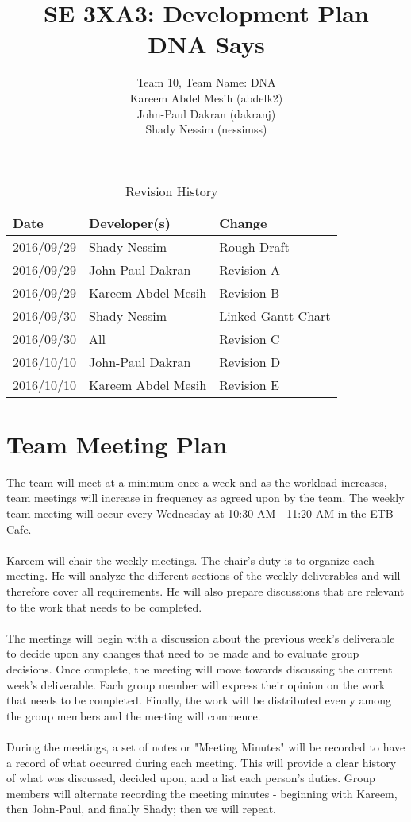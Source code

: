\documentclass{article}
\title{SE 3XA3: Development Plan\\DNA Says}
\author{Team 10, Team Name: DNA
		\\ Kareem Abdel Mesih (abdelk2)
		\\ John-Paul Dakran (dakranj)
		\\ Shady Nessim (nessimss)
}
\date{}
\begin{document}
\maketitle
\newpage
\tableofcontents

\begin{table}[hp]
\caption{Revision History} \label{TblRevisionHistory}
\begin{tabularx}{\textwidth}{llX}
\toprule
\textbf{Date} & \textbf{Developer(s)} & \textbf{Change}\\
\midrule
2016/09/29 & Shady Nessim & Rough Draft\\
2016/09/29 & John-Paul Dakran &  Revision A\\
2016/09/29 & Kareem Abdel Mesih &  Revision B\\
2016/09/30 & Shady Nessim & Linked Gantt Chart\\
2016/09/30 & All & Revision C\\
2016/10/10 & John-Paul Dakran & Revision D\\
2016/10/10 & Kareem Abdel Mesih & Revision E\\
\bottomrule
\end{tabularx}
\end{table}
\newpage
\newpage


\section{Team Meeting Plan} 
The team will meet at a minimum once a week and as the workload increases, team meetings will increase in frequency as agreed upon by the team. The weekly team meeting will occur every Wednesday at 10:30 AM - 11:20 AM in the ETB Cafe.\\
\\
\indent Kareem will chair the weekly meetings. The chair's duty is to organize each meeting. He will analyze the different sections of the weekly deliverables and will therefore cover all requirements. He will also prepare discussions that are relevant to the work that needs to be completed.\\
\\
\indent The meetings will begin with a discussion about the previous week's deliverable to decide upon any changes that need to be made and to evaluate group decisions. Once complete, the meeting will move towards discussing the current week's deliverable. Each group member will express their opinion on the work that needs to be completed. Finally, the work will be distributed evenly among the group members and the meeting will commence.\\
\\
\indent During the  meetings, a set of notes or "Meeting Minutes" will be recorded to have a record of what occurred during each meeting. This will provide a clear history of what was discussed, decided upon, and a list each person's duties. Group members will alternate recording the meeting minutes - beginning with Kareem, then John-Paul, and finally Shady; then we will repeat.
\end{document}
